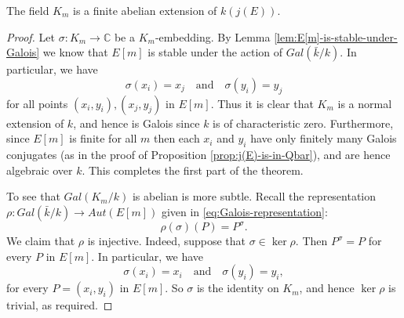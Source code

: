 \begin{thm}
  \label{thm:K_m-is-abelian-over-k(j(E))}
  The field $K_{m}$ is a finite abelian extension of $k(j(E))$.
\end{thm}
\begin{proof}

  Let $\sigma : K_{m} \rightarrow \mathbb{C}$ be a $K_{m}$-embedding.  By Lemma
  \ref{lem:E[m]-is-stable-under-Galois} we know that $E[m]$ is stable under the
  action of $Gal(\bar{k} / k)$.  In particular, we have
  \begin{equation*}
    \sigma(x_{i}) = x_{j} \quad \text{and} \quad \sigma(y_{i}) = y_{j}
  \end{equation*}
  for all points $(x_{i},y_{i}), (x_{j},y_{j})$ in $E[m]$.  Thus it is clear that
  $K_{m}$ is a normal extension of $k$, and hence is Galois since $k$ is of
  characteristic zero.  Furthermore, since $E[m]$ is finite for all $m$ then each
  $x_{i}$ and $y_{i}$ have only finitely many Galois conjugates (as in the proof of
  Proposition \ref{prop:j(E)-is-in-Qbar}), and are hence algebraic over $k$.  This
  completes the first part of the theorem.

  To see that $Gal(K_{m}/k)$ is abelian is more subtle.  Recall the representation
  $\rho : Gal(\bar{k} / k) \rightarrow Aut(E[m])$ given in
  \eqref{eq:Galois-representation}:
  \begin{equation*}
    \rho (\sigma) (P) = P^{\sigma}.
  \end{equation*}
  We claim that $\rho$ is injective.  Indeed, suppose that $\sigma \in \ker{\rho}$.
  Then $P^{\sigma} = P$ for every $P$ in $E[m]$.  In particular, we have
  \begin{equation*}
    \sigma (x_{i}) = x_{i} \quad \text{and} \quad \sigma (y_{i}) = y_{i},
  \end{equation*}
  for every $P = (x_{i},y_{i})$ in $E[m]$.  So $\sigma$ is the identity on $K_{m}$,
  and hence $\ker{\rho}$ is trivial, as required.


\end{proof}
